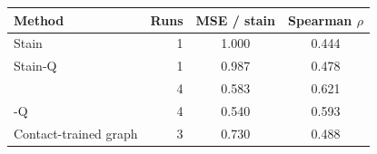 \begin{tabular}{@{}lrcc@{}}
\toprule
Method & Runs & MSE / stain & Spearman $\rho$ \\
\midrule
Stain & 1 & 1.000 & 0.444 \\
Stain-Q & 1 & 0.987 & 0.478 \\
\method{} & 4 & 0.583 & 0.621 \\
\method{}-Q & 4 & 0.540 & 0.593 \\
Contact-trained graph & 3 & 0.730 & 0.488 \\
\bottomrule
\end{tabular}
